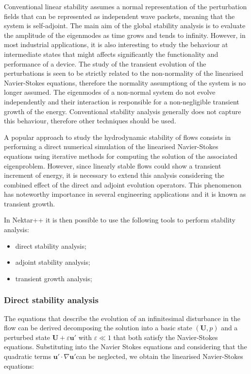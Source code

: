 Conventional linear stability assumes a normal representation of the perturbation fields that can be represented as independent wave packets, meaning that the system is self-adjoint. The main aim of the global stability analysis is to evaluate the amplitude of the eigenmodes as time grows and tends to infinity. However, in most industrial applications, it is also interesting to study the behaviour at intermediate states that might affects significantly the functionality and performance of a device. The study of the transient evolution of the perturbations is seen to be strictly related to the non-normality of the linearised Navier-Stokes equations, therefore the normality assumptiong of the system is no longer assumed. The eigenmodes of a non-normal system do not evolve independently and their interaction is responsible for a non-negligible transient growth of the energy. Conventional stability analysis generally does not capture this behaviour, therefore other techniques should be used.

A popular approach to study the hydrodynamic stability of flows consists in performing a direct numerical simulation of the linearised Navier-Stokes equations using iterative methods for computing the solution of the associated eigenproblem. However, since linearly stable flows could show a transient increment of energy, it is necessary to extend this analysis considering the combined effect of the direct and adjoint evolution operators. This phenomenon has noteworthy importance in several engineering applications and it is known as transient growth.

In Nektar++ it is then possible to use the following tools to perform stability analysis:

\begin{itemize}
\item direct stability analysis;
\item adjoint stability analysis;
\item  transient growth analysis;
\end{itemize}

\subsubsection{Direct stability analysis}


The equations that describe the evolution of an infinitesimal disturbance in the flow can be derived decomposing the solution into a basic state $(\mathbf{U}, p)$ and a perturbed state  $\mathbf{U}+\varepsilon \mathbf{u'}$ with $\varepsilon \ll 1$ that both satisfy the Navier-Stokes equations. Substituting into the Navier Stokes equations and considering that the quadratic terms $\mathbf{u'} \cdot \nabla \mathbf{u'}$can be neglected, we obtain the linearised Navier-Stokes equations:

